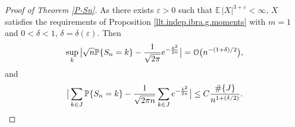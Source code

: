 \documentclass[11pt,draft,reqno]{amsart}
\theoremstyle{definition}
\theoremstyle{remarks}
\numberwithin{equation}{section}
\def \d{{\delta}}
\def \e{{\varepsilon}}
\def \qq{{\qquad}}
\def\P{{\mathcal P}}
\def\E{{\mathbb E \,}}
\def\P{{\mathbb P}}
\begin{document}
\begin{proof}[Proof of Theorem \ref{P-Sn}]
 
 
  As there exists   $\e>0$ such that $\E |X|^{3+\e}<\infty $, $X$ satisfies the requirements of  Proposition \ref{llt.indep.ibra.g.moments} with 
$m=1$ and
 $0<\d<1$, $\d= \d(\e)$. Then
\begin{align*}
\sup_{k}\big|  \sqrt n \P\{S_n=k\}-{1\over  \sqrt{ 2\pi}}e^{-  {k^2\over  2 n } }\big| ={\mathcal O}\big(n^{-(1+\d)/2}\big),\end{align*}
and
\begin{align}\label{P-Sn(3.3).} \big| \sum_{k\in J}\P\{S_n=k\}-{1\over  \sqrt{ 2\pi n}}\sum_{k\in J}
e^{-  {k^2\over  2 n } }\big|\le C  {\#\{J\}\over   n^{1+(\d/2)}}.
\end{align}


\end{proof}
\end{document}
